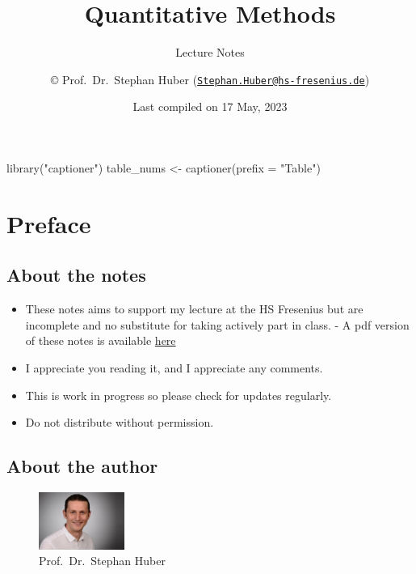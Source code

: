 \documentclass[
  12pt,
  oneside]{book}
\title{Quantitative Methods}
\subtitle{Lecture Notes}
\author{© Prof.~Dr.~Stephan Huber (\href{mailto:Stephan.Huber@hs-fresenius.de}{\nolinkurl{Stephan.Huber@hs-fresenius.de}})}
\date{Last compiled on 17 May, 2023}
\newenvironment{Shaded}{\begin{snugshade}}{\end{snugshade}}
\newcommand{\AttributeTok}[1]{\textcolor[rgb]{0.77,0.63,0.00}{#1}}
\newcommand{\FunctionTok}[1]{\textcolor[rgb]{0.00,0.00,0.00}{#1}}
\newcommand{\NormalTok}[1]{#1}
\newcommand{\OtherTok}[1]{\textcolor[rgb]{0.56,0.35,0.01}{#1}}
\newcommand{\StringTok}[1]{\textcolor[rgb]{0.31,0.60,0.02}{#1}}
\providecommand{\tightlist}{%
  \setlength{\itemsep}{0pt}\setlength{\parskip}{0pt}}
\theoremstyle{definition}
\theoremstyle{definition}
\theoremstyle{definition}
\theoremstyle{definition}
\theoremstyle{remark}
\begin{document}
\maketitle

{
\hypersetup{linkcolor=}
\setcounter{tocdepth}{2}
\tableofcontents
}
\begin{Shaded}
\begin{Highlighting}[]
\FunctionTok{library}\NormalTok{(}\StringTok{"captioner"}\NormalTok{)}
\NormalTok{table\_nums }\OtherTok{\textless{}{-}} \FunctionTok{captioner}\NormalTok{(}\AttributeTok{prefix =} \StringTok{"Table"}\NormalTok{)}
\end{Highlighting}
\end{Shaded}

\hypertarget{preface}{%
\chapter*{Preface}\label{preface}}

\hypertarget{about-the-notes}{%
\section*{About the notes}\label{about-the-notes}}

\begin{itemize}
\tightlist
\item
  These notes aims to support my lecture at the HS Fresenius but are incomplete and no substitute for taking actively part in class. - A pdf version of these notes is available \href{https://raw.githubusercontent.com/hubchev/hubchev.github.io/main/qm/_main.pdf}{here}
\item
  I appreciate you reading it, and I appreciate any comments.
\item
  This is work in progress so please check for updates regularly.
\item
  Do not distribute without permission.
\end{itemize}

\hypertarget{about-the-author}{%
\section*{About the author}\label{about-the-author}}

\begin{figure}
\centering
\includegraphics[width=0.25\textwidth,height=\textheight]{fig/huber2.jpeg}
\caption[\label{fig:itsme} Prof.~Dr.~Stephan Huber]{\label{fig:itsme} Prof.~Dr.~Stephan Huber\footnotemark{}}
\end{figure}
\end{document}
